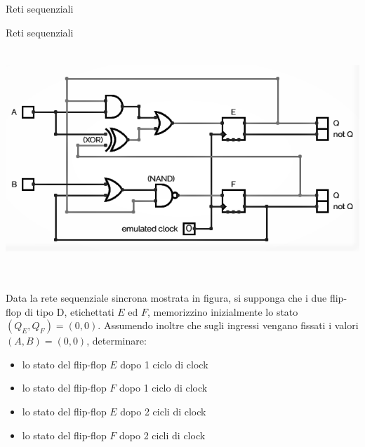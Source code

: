 \documentclass[11pt]{article}
\begin{document}
\begin{quiz}{Reti sequenziali}



\begin{cloze}[points=1,shuffle=false]{Reti sequenziali}
    \includegraphics[height=9cm]{figures/seq_1.png}
    
    Data la rete sequenziale sincrona mostrata in figura, si supponga che i due flip-flop di tipo D,
    etichettati $E$ ed $F$, memorizzino inizialmente lo stato $(Q_E,Q_F) = (0,0)$.
    Assumendo inoltre che sugli ingressi vengano fissati i valori $(A,B)=(0,0)$,
    determinare:
    
    \begin{itemize}
    \item lo stato del flip-flop $E$ dopo 1 ciclo di clock 
    \item lo stato del flip-flop $F$ dopo 1 ciclo di clock 
    \item lo stato del flip-flop $E$ dopo 2 cicli di clock 
    \item lo stato del flip-flop $F$ dopo 2 cicli di clock 
    \end{itemize}
\end{cloze}
    

\end{quiz}
\end{document}
